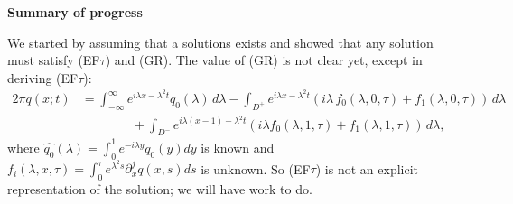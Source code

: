 \documentclass[11pt, oneside, a4paper]{article}
\begin{document}
\bigskip

{\large \bf Summary of progress}

\bigskip

We started by assuming that a solutions exists and showed that any solution must satisfy (EF$\tau$) and (GR). The value of (GR) is not clear yet, except in deriving (EF$\tau$):
\begin{equation*}
\begin{aligned}
2\pi q(x;t) &= \int_{-\infty}^\infty e^{i\lambda x - \lambda^2 t}\widehat{q_0}(\lambda)\,d\lambda - \int_{D^+} e^{i\lambda x - \lambda^2 t}(i\lambda\,f_0(\lambda,0,\tau)+f_1(\lambda,0,\tau))\,d\lambda \\
  &\qquad \qquad + \int_{D^-} e^{i\lambda(x-1)-\lambda^2t}(i\lambda f_0(\lambda,1,\tau) + f_1(\lambda,1,\tau))\,d\lambda,
\end{aligned}
\end{equation*}
where $\widehat{q_0}(\lambda) = \int_0^1e^{-i\lambda y}q_0(y)dy$ is known and $f_i(\lambda,x,\tau) = \int_0^\tau e^{\lambda^2s}\partial_x^jq(x,s)ds$ is unknown. So (EF$\tau$) is not an explicit representation of the solution; we will have work to do.
\end{document}
